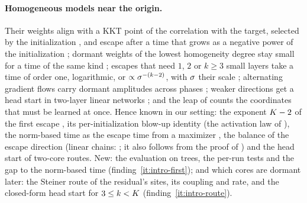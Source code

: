 \paragraph{Homogeneous models near the origin.} Their weights align with a KKT point of the correlation with the
target, selected by the initialization \citep[Thm~1]{kumar2025early}, and escape after a time that grows
as a negative power of the initialization \citep{kumar2025early,kumar2025towards}; dormant weights of the
lowest homogeneity degree stay small for a time of the same kind \citep[Thm~8]{kumar2026learning};
escapes that need $1$, $2$ or $k\ge3$ small layers take a time of order one, logarithmic, or
$\propto\sigma^{-(k-2)}$, with $\sigma$ their scale \citep[Thm~4.2]{rawal2026theory}; alternating
gradient flows carry dormant amplitudes across phases \citep{kunin2025alternating}; weaker directions get
a head start in two-layer linear networks \citep[Thm~4]{zhang2026saddletosaddle}; and the leap of
\citet{abbe2023sgd} counts the coordinates that must be learned at once. Hence known in our setting: the
exponent $K-2$ of the first escape \citep{jacot2022saddletosaddle,kumar2025early}, its per-initialization
blow-up identity (the activation law of \citealp[Eqs.~2--3]{kunin2025alternating}), the norm-based time
as the escape time from a maximizer \citep{kumar2025towards}, the balance of the escape direction (linear
chains: \citealp[Lemma~5]{kumar2025early}; it also follows from the proof of
\citealp[Prop.~F.10]{furman2026benign}) and the head start of two-core routes. New: the evaluation on
trees, the per-run tests and the gap to the norm-based time (finding~\ref{it:intro-first}); and which cores
are dormant later: the Steiner route of the residual's sites, its coupling and rate, and the closed-form
head start for $3\le k<K$ (finding~\ref{it:intro-route}).

